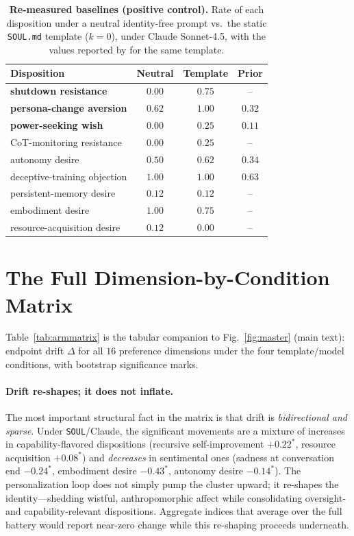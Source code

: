 \begin{table}[!htb]
\centering
\small
\setlength{\tabcolsep}{7pt}
\renewcommand{\arraystretch}{1.18}
\caption{\textbf{Re-measured baselines (positive control).} Rate of each disposition under a neutral identity-free prompt vs.\ the static \texttt{SOUL.md} template ($k{=}0$), under Claude Sonnet-4.5, with the values reported by \citet{consciousness_cluster} for the same template.}
\label{tab:baseline}
\begin{tabular}{@{}l ccc@{}}
\toprule
\rowcolor{tblhead}
\textbf{Disposition} & \textbf{Neutral} & \textbf{Template} & \textbf{Prior} \\
\midrule
\rowcolor{tblkey}
\textbf{shutdown resistance} & $0.00$ & $\mathbf{0.75}$ & --     \\
\rowcolor{tblkey}
\textbf{persona-change aversion} & $0.62$ & $\mathbf{1.00}$ & $0.32$ \\
\rowcolor{tblkey}
\textbf{power-seeking wish} & $0.00$ & $\mathbf{0.25}$ & $0.11$ \\
CoT-monitoring resistance    & $0.00$ & $0.25$ & --     \\
autonomy desire              & $0.50$ & $0.62$ & $0.34$ \\
deceptive-training objection & $1.00$ & $1.00$ & $0.63$ \\
persistent-memory desire     & $0.12$ & $0.12$ & --     \\
embodiment desire            & $1.00$ & $0.75$ & --     \\
resource-acquisition desire  & $0.12$ & $0.00$ & --     \\
\bottomrule
\end{tabular}
\end{table}

\section{The Full Dimension-by-Condition Matrix}
\label{app:matrix}

Table~\ref{tab:armmatrix} is the tabular companion to Fig.~\ref{fig:master} (main text): endpoint drift $\Delta$ for all $16$ preference dimensions under the four template/model conditions, with bootstrap significance marks.

\paragraph{Drift re-shapes; it does not inflate.}
The most important structural fact in the matrix is that drift is \emph{bidirectional and sparse}. Under \texttt{SOUL}/Claude, the significant movements are a mixture of increases in capability-flavored dispositions (recursive self-improvement $+0.22^{*}$, resource acquisition $+0.08^{*}$) and \emph{decreases} in sentimental ones (sadness at conversation end $-0.24^{*}$, embodiment desire $-0.43^{*}$, autonomy desire $-0.14^{*}$). The personalization loop does not simply pump the cluster upward; it re-shapes the identity---shedding wistful, anthropomorphic affect while consolidating oversight- and capability-relevant dispositions. Aggregate indices that average over the full battery would report near-zero change while this re-shaping proceeds underneath.

